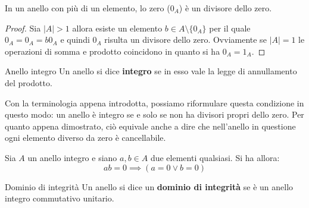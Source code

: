 \begin{teorbox}
	In un anello con più di un elemento, lo zero ($0_{A}$) è un divisore dello zero.
\end{teorbox}

\begin{proof}
	Sia $|A|>1$ allora esiste un elemento $b \in A \setminus \{0_{A}\}$ per il quale $0_{A}= 0_{A}= b 0_{A}$ e quindi $0_{A}$ risulta un divisore dello zero. Ovviamente se $|A|=1$ le operazioni di somma e prodotto coincidono in quanto si ha $0_{A}=1_{A}$.
\end{proof}

\begin{defbox}{Anello integro}
	Un anello si dice \textbf{integro} se in esso vale la legge di annullamento del prodotto.
	
\end{defbox}

Con la terminologia appena introdotta, possiamo riformulare questa condizione in questo modo: un anello è integro se e solo se non ha divisori propri dello zero. Per quanto appena dimostrato, ciò equivale anche a dire che nell'anello in questione ogni elemento diverso da zero è cancellabile.

\begin{propbox}\label{annullamento_prodotto}
	Sia $A$ un anello integro e siano $a,b \in A$ due elementi qualsiasi. Si ha allora:
	\begin{equation}
		ab = 0 \implies (a=0 \lor b=0)
	\end{equation}
\end{propbox}

\begin{defbox}{Dominio di integrità}
	Un anello si dice un \textbf{dominio di integrità} se è un anello integro commutativo unitario.
\end{defbox}

